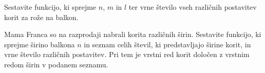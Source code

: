 \documentclass[arhiv]{../izpit}
\begin{document}
  \noindent
  Sestavite funkcijo, ki sprejme $n$, $m$ in $l$ ter vrne število vseh različnih postavitev korit za rože na balkon.
 
  \podnaloga Mama Franca so na razprodaji nabrali korita različnih širin. Sestavite funkcijo, ki sprejme širino balkona $n$ in seznam celih števil, ki predstavljajo širine korit, in vrne število različnih postavitev. Pri tem je vrstni red korit določen z vrstnim redom širin v podanem seznamu.
	
\end{document}
